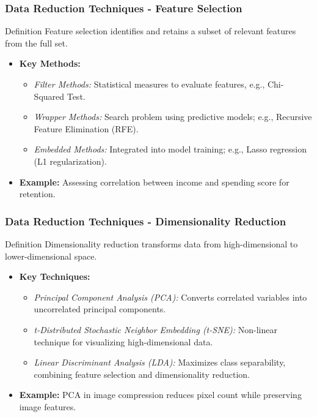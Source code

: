 \documentclass[aspectratio=169]{beamer}
\begin{document}
\begin{frame}[fragile]
    \frametitle{Data Reduction Techniques - Feature Selection}
    \begin{block}{Definition}
        Feature selection identifies and retains a subset of relevant features from the full set.
    \end{block}

    \begin{itemize}
        \item \textbf{Key Methods:}
            \begin{itemize}
                \item \textit{Filter Methods:} Statistical measures to evaluate features, e.g., Chi-Squared Test.
                \item \textit{Wrapper Methods:} Search problem using predictive models; e.g., Recursive Feature Elimination (RFE).
                \item \textit{Embedded Methods:} Integrated into model training; e.g., Lasso regression (L1 regularization).
            \end{itemize}
        \item \textbf{Example:} Assessing correlation between income and spending score for retention.
    \end{itemize}
\end{frame}

\begin{frame}[fragile]
    \frametitle{Data Reduction Techniques - Dimensionality Reduction}
    \begin{block}{Definition}
        Dimensionality reduction transforms data from high-dimensional to lower-dimensional space.
    \end{block}

    \begin{itemize}
        \item \textbf{Key Techniques:}
            \begin{itemize}
                \item \textit{Principal Component Analysis (PCA):} Converts correlated variables into uncorrelated principal components.
                \item \textit{t-Distributed Stochastic Neighbor Embedding (t-SNE):} Non-linear technique for visualizing high-dimensional data.
                \item \textit{Linear Discriminant Analysis (LDA):} Maximizes class separability, combining feature selection and dimensionality reduction.
            \end{itemize}
        \item \textbf{Example:} PCA in image compression reduces pixel count while preserving image features.
    \end{itemize}
\end{frame}
\end{document}
